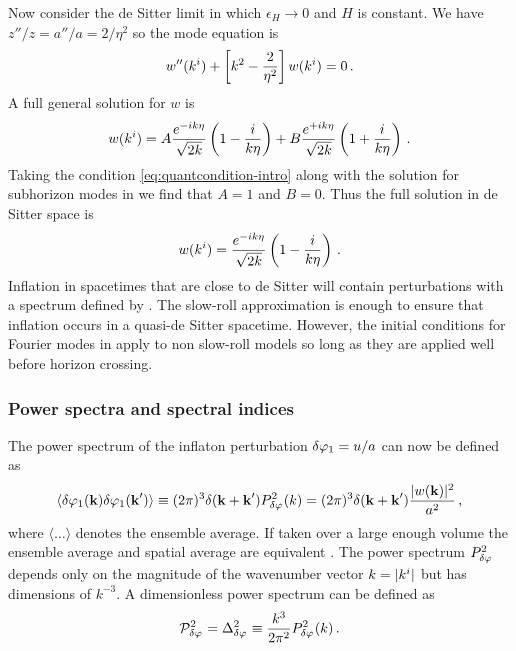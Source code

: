 Now consider the de Sitter limit in which $\epsilon_H\rightarrow 0$ and $H$
is constant. We have $z''/z = a''/a = 2/\eta^2$ so the mode equation is
% 
\begin{equation}
  w''(k^i) + \left[ k^2 -\frac{2}{\eta^2} \right]w(k^i) = 0\,.
\end{equation}
% 
A full general solution for $w$ is
% 
\begin{equation}
 w(k^i) = A\frac{e^{-ik\eta}}{\sqrt{2k}}\left(1 -\frac{i}{k\eta}\right)
	  +B\frac{e^{+ik\eta}}{\sqrt{2k}}\left(1 +\frac{i}{k\eta}\right)\,.
\end{equation}
% 
Taking the condition \eqref{eq:quantcondition-intro} along with the solution
for subhorizon modes in  we find that $A=1$ and $B=0$.
Thus the full solution in de Sitter space is \cite{book:liddle}
% 
\begin{equation}
\label{eq:wfinal-intro}
 w(k^i) = \frac{e^{-ik\eta}}{\sqrt{2k}}\left(1 -\frac{i}{k\eta}\right)\,.
\end{equation}
% 
Inflation in spacetimes that are close to de Sitter will contain perturbations
with a spectrum defined by . The slow-roll approximation is
enough to ensure that inflation occurs in a quasi-de Sitter spacetime.
However, the initial conditions for Fourier modes in 
apply to non slow-roll models so long as they are applied well before horizon
crossing.


\subsubsection{Power spectra and spectral indices}
The power spectrum of the inflaton perturbation $\delta\varphi_{1} = u/a$ can now be
defined as
% 
\begin{equation}
  \langle \delta\varphi_{1}(\textbf{k}) \delta\varphi_{1}(\textbf{k}') \rangle 
   \equiv (2\pi)^3 \delta(\textbf{k} + \textbf{k}') P_{\delta\varphi_{}}^2 (k)
   = (2\pi)^3 \delta(\textbf{k} + \textbf{k}') \frac{|w(\textbf{k})|^2}{a^2}\,,
\end{equation}
% 
where $\langle \ldots \rangle$ denotes the ensemble average. 
If taken over a large enough volume the ensemble average and spatial average
are equivalent \cite{book:lyth}.
The power spectrum
$P_{\delta\varphi_{}}^2$ depends only on the magnitude of the wavenumber
vector $k=|k^i|$ but has dimensions of $k^{-3}$. A dimensionless power spectrum
can be defined as
% 
\begin{equation}
 \label{eq:curlPrdefn-intro}
 \mathcal{P}_{\delta\varphi_{}}^2= \Delta^2_{\delta\varphi_{}} \equiv \frac{k^3}{2\pi^2}
P_{\delta\varphi_{}}^2(k)\,.
\end{equation}
% 

